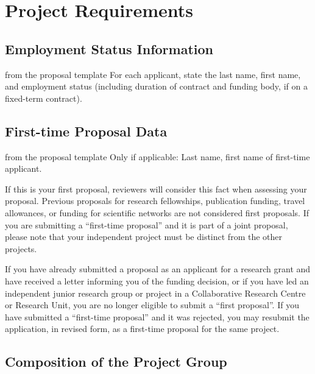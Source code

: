 \section{Project Requirements}\label{sec:requirements}

\subsection{Employment Status Information}\label{sec:req:employment-status}

\begin{todo}{from the proposal template}
  For each applicant, state the last name, first name, and employment status (including
  duration of contract and funding body, if on a fixed-term contract).
\end{todo}

\subsection{First-time Proposal Data}\label{sec:req:first}

\begin{todo}{from the proposal template}
  Only if applicable: Last name, first name of first-time applicant.

  If this is your first proposal, reviewers will consider this fact when assessing your
  proposal. Previous proposals for research fellowships, publication funding, travel
  allowances, or funding for scientific networks are not considered first proposals. If
  you are submitting a “first-time proposal” and it is part of a joint proposal, please
  note that your independent project must be distinct from the other projects.

  If you have already submitted a proposal as an applicant for a research grant and have
  received a letter informing you of the funding decision, or if you have led an
  independent junior research group or project in a Collaborative Research Centre or
  Research Unit, you are no longer eligible to submit a ``first proposal''. If you have
  submitted a ``first-time proposal'' and it was rejected, you may resubmit the
  application, in revised form, as a first-time proposal for the same project.
\end{todo}

\subsection{Composition of the Project Group}\label{sec:req:group}

